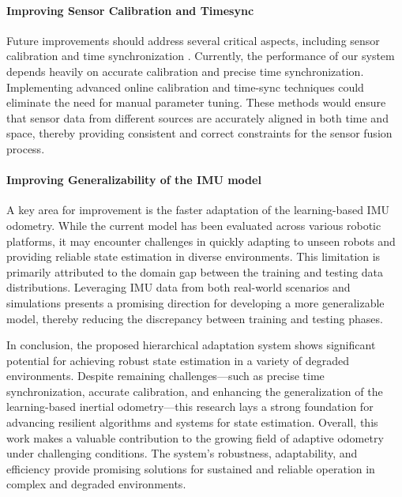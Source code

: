 \paragraph{Improving Sensor Calibration and Timesync} Future improvements should address several critical aspects, including sensor calibration and time synchronization \cite{lv2022observability,10443246}. Currently, the performance of our system depends heavily on accurate calibration and precise time synchronization. Implementing advanced online calibration and time-sync techniques could eliminate the need for manual parameter tuning. These methods would ensure that sensor data from different sources are accurately aligned in both time and space, thereby providing consistent and correct constraints for the sensor fusion process.

\paragraph{Improving Generalizability of the IMU model} A key area for improvement is the faster adaptation of the learning-based IMU odometry. While the current model has been evaluated across various robotic platforms, it may encounter challenges in quickly adapting to unseen robots and providing reliable state estimation in diverse environments. This limitation is primarily attributed to the domain gap between the training and testing data distributions. Leveraging IMU data from both real-world scenarios and simulations presents a promising direction for developing a more generalizable model, thereby reducing the discrepancy between training and testing phases.


In conclusion, the proposed hierarchical adaptation system shows significant potential for achieving robust state estimation in a variety of degraded environments. Despite remaining challenges—such as precise time synchronization, accurate calibration, and enhancing the generalization of the learning-based inertial odometry—this research lays a strong foundation for advancing resilient algorithms and systems for state estimation.
Overall, this work makes a valuable contribution to the growing field of adaptive odometry under challenging conditions. The system’s robustness, adaptability, and efficiency provide promising solutions for sustained and reliable operation in complex and degraded environments.
